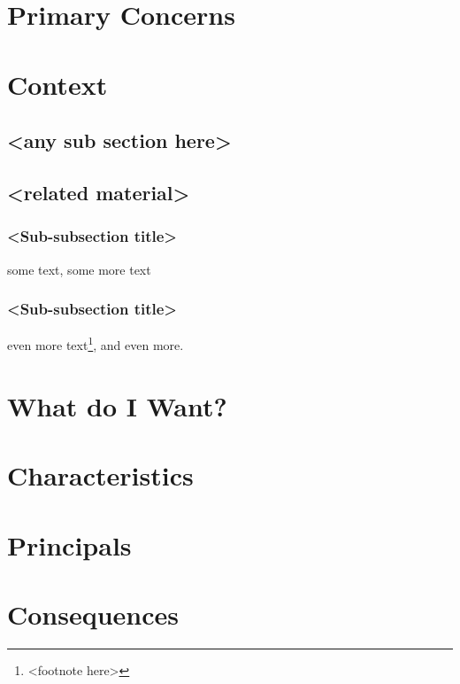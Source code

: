 \chapter{Primary Concerns}



\chapter{Context}
\section{<any sub section here>}

\section{<related material>}

\subsection{<Sub-subsection title>}
some text\cite{citation-1-name-here}, some more text

\subsection{<Sub-subsection title>}
even more text\footnote{<footnote here>}, and even more.

\chapter{What do I Want?}

\chapter{Characteristics}

\chapter{Principals}

\chapter{Consequences}
